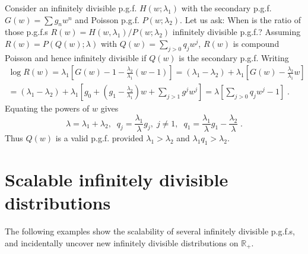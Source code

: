 \documentclass[a4paper,12pt]{amsart}
\newcommand{\R}{\mathbb{R}_{+}}
\theoremstyle{definition}
\theoremstyle{remark}
\begin{document}
\begin{enumerate}[label=(\roman*), leftmargin=*]
Consider an infinitely divisible p.g.f. $H(w;\lambda_1)$ with the secondary p.g.f. $G(w)=\sum g_nw^n$ and Poisson p.g.f. $P(w;\lambda_2)$. Let us ask: When is the ratio of those p.g.f.{}s $R(w)=H(w,\lambda_1)/P(w;\lambda_2)$ infinitely divisible p.g.f.? Assuming $R(w)=P(Q(w);\lambda)$ with $Q(w)=\sum_{j>0}q_jw^j$, $R(w)$ is compound Poisson and hence infinitely divisible if $Q(w)$ is the secondary p.g.f. Writing
\begin{eqnarray}
\log R(w) =\lambda_1\left[G(w)-1-\frac{\lambda_2}{\lambda_1}(w-1)\right]=
(\lambda_1\!-\!\lambda_2)+\lambda_1\left[G(w)-\frac{\lambda_2}{\lambda_1} w\right]\\\nonumber
=(\lambda_1\!-\!\lambda_2)+\lambda_1\left[g_0 +\left (g_1-\frac{\lambda_2}{\lambda_1}\right) w +\sum_{j>1}g^jw^j\right]=
\lambda \left[\sum_{j>0}q_jw^j -1 \right]\;.
   \end{eqnarray}
Equating the powers of $w$ gives
\[
\lambda=\lambda_1+\lambda_2,\; \; q_j=\frac{\lambda_1}{\lambda}g_j,\; j\neq 1,\; \;
q_1=\frac{\lambda_1}{\lambda}g_1-\frac{\lambda_2}{\lambda}\;.
\]
Thus $Q(w)$ is a valid p.g.f. provided $\lambda_1>\lambda_2$ and $\lambda_1 q_1>\lambda_2$.
\end{enumerate}

\section{Scalable infinitely divisible distributions}\label{Exscal}

The following examples show the scalability of several infinitely divisible p.g.f.{}s, and incidentally uncover new infinitely divisible distributions on $\R$. 
\end{document}
